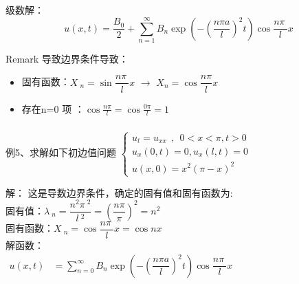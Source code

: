 \begin{frame}
	\frametitle{}
	级数解：
	\begin{equation*}
		u(x,t)=\frac{B_0 }{2}+ \sum\limits_{n=1}^{\infty } B_n  \exp(-(\frac{n\pi a}{l})^2 t) \cos \frac{n\pi~}{l} x
	\end{equation*}	
	\begin{block} {Remark }
		导致边界条件导致：
		\begin{itemize}
			\item  固有函数：$X~_n=\sin \dfrac{n\pi~}{l} x$ $\to$ 	$X_n=\cos \dfrac{n\pi}{l} x$
			\item 	存在n=0 项 ：$\cos \frac{n\pi}{l} = \cos \frac{0\pi}{l} =1$
		\end{itemize}
	\end{block}
\end{frame}	

\begin{frame}
	\frametitle{}
	\begin{exampleblock} {例5、求解如下初边值问题}
	$\displaystyle  \begin{cases}
		u_{t} =u_{xx} ~~,~~ 0<x<\pi, t>0\\
		u_x (0,t) =0, u_x (l,t)=0 \\
		u(x,0) =x^2 (\pi-x)^2
	\end{cases}$ \\	
	\end{exampleblock}
	\alert{解：} 	
	这是导数边界条件，确定的固有值和固有函数为:\\
	固有值：$\displaystyle  \lambda~_n=\dfrac{n^2\pi~^2}{l~^2 }= (\dfrac{n\pi }{\pi}) ^2 = n^2$ \\ 
	固有函数：$\displaystyle  X~_n=\cos \dfrac{n\pi~}{l} x=\cos nx $\\
	解函数：\\ 
	$\displaystyle \begin{array}{llll}
		u(x,t)&=  \sum\limits_{n=0}^{\infty } B_n  \exp(-(\dfrac{n\pi a}{l})^2 t) \cos \dfrac{n\pi~}{l} x\\
	\end{array}$ \\ 	
\end{frame}	

